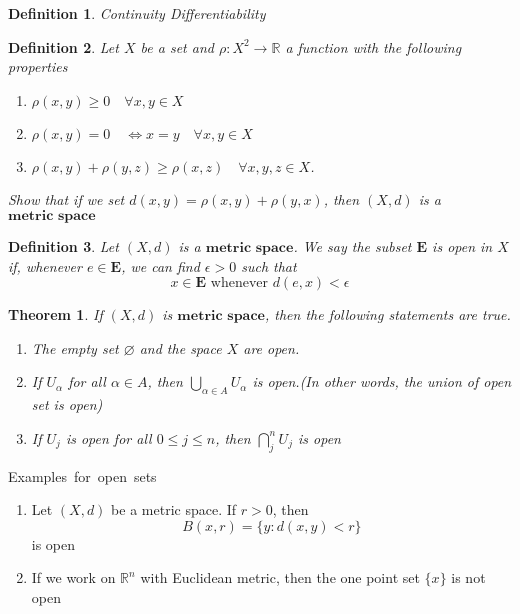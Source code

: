 \documentclass{article}
\begin{document}
\newtheorem{theorem}{Theorem}[section]
\newtheorem{defn}{Definition}[section]

\begin{defn}
Continuity
Differentiability
\end{defn}

\begin{defn}
Let $X$ be a set and $\rho: X^2 \rightarrow \mathbb{R}$ a function with the following properties
    \begin{enumerate}
        \item  $\rho(x, y) \geq 0 \quad \forall x, y \in X$ 
        \item  $\rho(x, y) = 0 \quad \iff x = y \quad \forall x, y \in X$ 
        \item  $\rho(x, y) + \rho(y, z) \geq \rho(x, z) \quad \forall x, y, z \in X$. 
    \end{enumerate}
Show that if we set $d(x, y) = \rho(x, y) + \rho(y, x)$, then $(X, d)$ is a $\textbf{metric space}$
\end{defn}

\begin{defn}
Let $(X, d)$ is a $\textbf{metric space}$. We say the subset $\mathbf{E}$ is open in $X$ if, whenever $e \in \mathbf{E}$, we can find $\epsilon > 0$ such that
\[ x \in \mathbf{E} \mbox{ whenever } d(e, x) < \epsilon \]
\end{defn}

\begin{theorem}
If $(X, d)$ is $\textbf{metric space}$, then the following statements are true.
    \begin{enumerate} 
    \item The empty set $\varnothing$ and the space $X$ are open.
    \item If $U_{\alpha}$ for all $\alpha \in A$, then $\bigcup_{\alpha \in A} U_{\alpha}$ is open.(In other words, the union of open set is open)
    \item If $U_{j}$ is open for all $0 \leq j \leq n$, then $\bigcap_{j}^{n} U_j$ is open
    \end{enumerate}
\end{theorem}

\noindent
\mbox{Examples for open sets}
\begin{enumerate}
    \item Let $(X, d)$ be a metric space. If $r > 0$, then
    \[ B(x, r) = \{ y: d(x, y) < r \}\]
    is open
    \item If we work on $\mathbb{R}^n$ with Euclidean metric, then the one point set $\{x\}$ is not open 
\end{enumerate}
\end{document}
